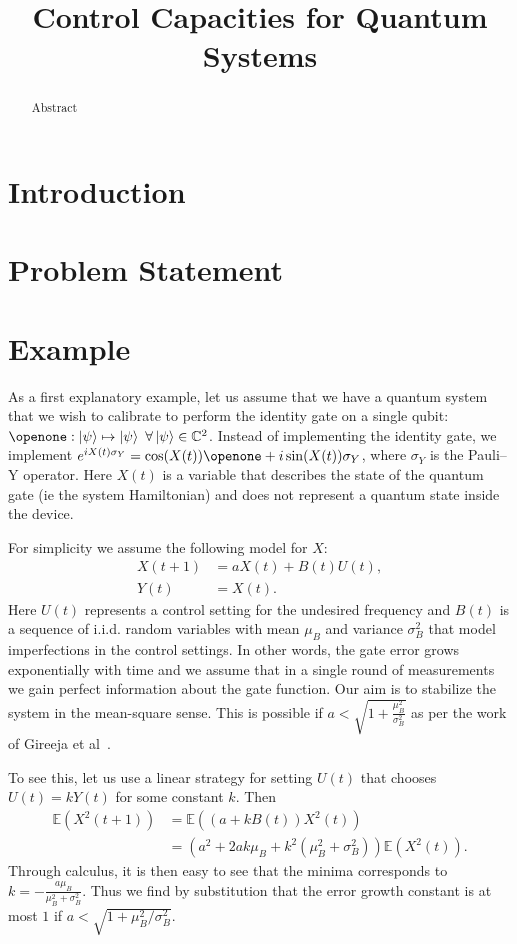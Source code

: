 \documentclass[superscriptaddress,aps,pra,nofootinbib,onecolumn,notitlepage,10pt]{revtex4-1}
\def\ket#1{\mathinner{|{#1}\rangle}}
\begin{document}
\title{Control Capacities for Quantum Systems}
\begin{abstract}
Abstract
\end{abstract}
\maketitle
\section{Introduction}
\section{Problem Statement}
\section{Example}
As a first explanatory example, let us assume that we have a quantum system that we wish to calibrate to perform the identity gate on a single qubit: $\openone : \ket{\psi} \mapsto \ket{\psi}~\forall \ket{\psi}\in \mathbb{C}^2$.  Instead of implementing the identity gate, we implement $e^{i X(t) \sigma_Y} = \cos(X(t)) \openone + i\sin(X(t)) \sigma_Y$, where $\sigma_Y$ is the Pauli--Y operator.  Here $X(t)$ is a variable that describes the state of the quantum gate (ie the system Hamiltonian) and does not represent a quantum state inside the device.

For simplicity we assume the following model for $X$:
\begin{align}
X(t+1) &= a X(t) + B(t) U(t),\nonumber\\
Y(t)&=X(t).
\end{align}
Here $U(t)$ represents a control setting for the undesired frequency and $B(t)$ is a sequence of i.i.d. random variables with mean $\mu_B$ and variance $\sigma_B^2$ that model imperfections in the control settings.
In other words, the gate error grows exponentially with time and we assume that in a single round of measurements we gain perfect information about the gate function.  Our aim is to stabilize the system in the mean-square sense.  This is possible if $a < \sqrt{1+ \frac{\mu_B^2}{\sigma_B^2}}$ as per the work of Gireeja et al~\cite{}.

To see this, let us use a linear strategy for setting $U(t)$ that chooses $U(t) =k Y(t)$ for some constant $k$.  Then
\begin{align}
\mathbb{E}(X^2(t+1)) &= \mathbb{E}((a+kB(t))X^2(t))\nonumber\\
&=(a^2+2ak\mu_B + k^2(\mu_B^2+\sigma_B^2))\mathbb{E}(X^2(t)).
\end{align}
Through calculus, it is then easy to see that the minima corresponds to $k = - \frac{a\mu_B}{\mu_B^2+\sigma_B^2}$.  Thus we find by substitution that the error growth constant is at most $1$ if $a < \sqrt{1+\mu_B^2/\sigma_B^2}$.
\end{document}
